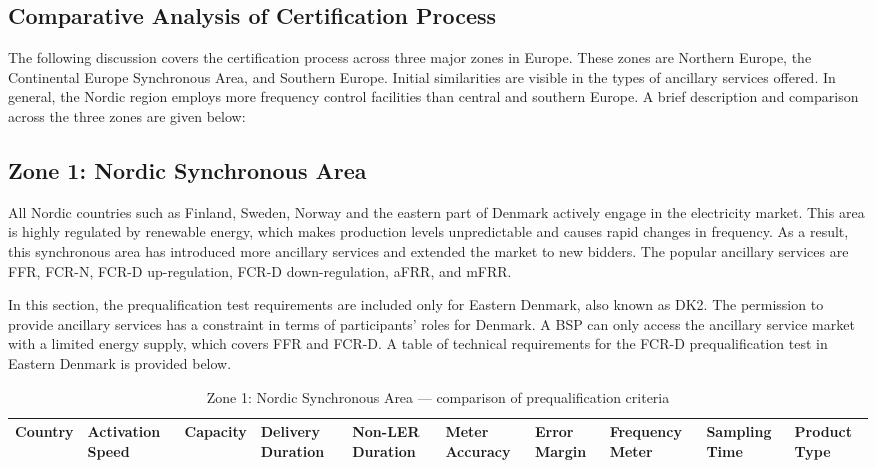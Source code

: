 \begin{landscape}

    \section{Comparative Analysis of Certification Process}
The following discussion covers the certification process across three major zones in Europe. These zones are Northern Europe, the Continental Europe Synchronous Area, and Southern Europe. Initial similarities are visible in the types of ancillary services offered. In general, the Nordic region employs more frequency control facilities than central and southern Europe. A brief description and comparison across the three zones are given below:
    \subsection{Zone 1: Nordic Synchronous Area}
    All Nordic countries such as Finland, Sweden, Norway and the eastern part of Denmark actively engage in the electricity market. This area is highly regulated by renewable energy, which makes production levels unpredictable and causes rapid changes in frequency. As a result, this synchronous area has introduced more ancillary services and extended the market to new bidders. The popular ancillary services are FFR, FCR-N, FCR-D up-regulation, FCR-D down-regulation, aFRR, and mFRR.
    
    In this section, the prequalification test requirements are included only for Eastern Denmark, also known as DK2. The permission to provide ancillary services has a constraint in terms of participants' roles for Denmark. A BSP can only access the ancillary service market with a limited energy supply, which covers FFR and FCR-D. A table of technical requirements for the FCR-D prequalification test in Eastern Denmark is provided below.


\tiny
\setlength{\tabcolsep}{2pt}
\renewcommand{\arraystretch}{1.3}
\begin{longtable}{|p{1.5cm}|p{2.5cm}|p{2.5cm}|p{1.8cm}|p{2.5cm}|p{1.5cm}|p{4cm}|p{2.5cm}|p{2.5cm}|p{2cm}|}
    
\caption{Zone 1: Nordic Synchronous Area --- comparison of prequalification criteria}\label{tab:Nordic}\\

\hline
\textbf{Country} & \textbf{Activation Speed} & \textbf{Capacity} & \textbf{Delivery Duration} & \textbf{Non-LER Duration} & \textbf{Meter Accuracy} & \textbf{Error Margin} & \textbf{Frequency Meter} & \textbf{Sampling Time} & \textbf{Product Type} \\
\hline
\endfirsthead


\end{longtable}
\end{landscape}

